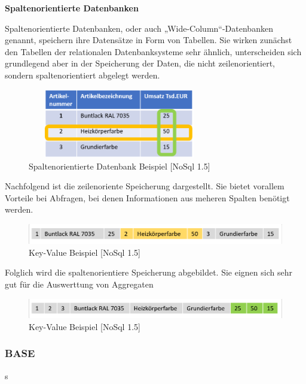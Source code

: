 \textbf{Spaltenorientierte Datenbanken}
\newline

Spaltenorientierte Datenbanken, oder auch „Wide-Column“-Datenbanken genannt, speichern ihre Datensätze in Form von Tabellen.  Sie wirken zunächst den Tabellen der relationalen Datenbanksysteme sehr ähnlich, unterscheiden sich grundlegend aber in der Speicherung der Daten, die nicht zeilenorientiert, sondern spaltenorientiert abgelegt werden. 
\newpage


\begin{figure}[h]
\centering
\includegraphics[width=8cm, height = 3cm]{images/SpaltenorientiereDatenbank.png}
\caption{Spaltenorientierte Datenbank Beispiel [NoSql 1.5]}
\end{figure}

Nachfolgend ist die zeilenoriente Speicherung dargestellt. Sie bietet vorallem Vorteile bei Abfragen, bei denen Informationen aus meheren Spalten benötigt werden.
\newline


\begin{figure}[h]
\centering
\includegraphics[width=15cm]{images/zeilenorientiert.png}
\caption{Key-Value Beispiel [NoSql 1.5]}
\end{figure}

Folglich wird die spaltenorientiere Speicherung abgebildet. Sie eignen sich sehr gut für die Auswerttung von Aggregaten
\newline


\begin{figure}[h]
\centering
\includegraphics[width=15cm]{images/spaltenorientiert.png}
\caption{Key-Value Beispiel [NoSql 1.5]}
\end{figure}

\subsubsection{BASE}
s
\newline

